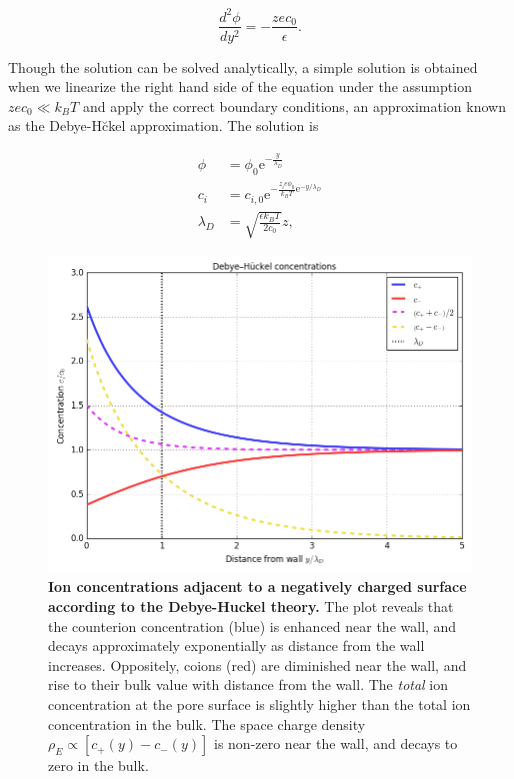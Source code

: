 			\[ \frac{d^{2}\phi}{dy^{2}}=-\frac{zec_{0}}{\epsilon}. \]
			
			Though the solution can be solved analytically, a simple solution is obtained when we linearize the right hand side of the equation under the assumption $zec_{0}\ll k_{B}T$ and apply the correct boundary conditions, an approximation known as the Debye-H\u ckel approximation. The solution is
			
			\begin{equation} \label{eq:pb1d}
				\begin{split}
					\phi &= \phi_{0}\mathrm{e}^{-\frac{y}{\lambda_{D}}} \\
					c_{i} &= c_{i,0}\mathrm{e}^{-\frac{z_{i}e\phi_{0}}{k_{B}T}\mathrm{e}^{-y/\lambda_{D}}} \\
					\lambda_{D} &= \sqrt{\frac{\epsilon k_{B}T}{2c_{0}}}z,
				\end{split}				
			\end{equation}
			
			\begin{figure}
				\includegraphics[width=\textwidth]{EDL_Charge_Distribution.png}
				\caption{\textbf{Ion concentrations adjacent to a negatively charged surface according to the Debye-Huckel theory.} The plot reveals that the counterion concentration (blue) is enhanced near the wall, and decays approximately exponentially as distance from the wall increases. Oppositely, coions (red) are diminished near the wall, and rise to their bulk value with distance from the wall. The \textit{total} ion concentration at the pore surface is slightly higher than the total ion concentration in the bulk. The space charge density $\rho_{E}\propto\left[c_{+}\left(y\right)-c_{-}\left(y\right)\right]$ is non-zero near the wall, and decays to zero in the bulk.}
				\label{fig:EDLChargeDistribution}
			\end{figure}

